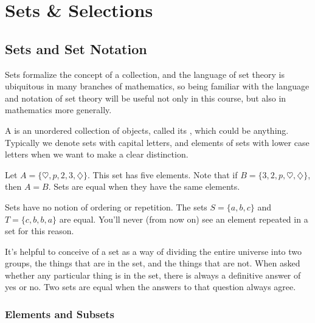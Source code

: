 \pagestyle{headings}
\chapter{Sets \& Selections} \label{chp 2}

\section{Sets and Set Notation}

Sets formalize the concept of a collection, and the language of set theory is ubiquitous in many branches of mathematics, so being familiar with the language and notation of set theory will be useful not only in this course, but also in mathematics more generally.

\begin{definition}
A  is an unordered collection of objects, called its , which could be anything. Typically we denote sets with capital letters, and elements of sets with lower case letters when we want to make a clear distinction.
\end{definition}

\begin{example}
Let $A = \{\heartsuit, p, 2, 3, \diamondsuit\}$. This set has five elements. Note that if $B = \{3,2,p,\heartsuit,\diamondsuit\}$, then $A = B$. Sets are equal when they have the same elements.
\end{example}

\begin{keypoint}
Sets have no notion of ordering or repetition. The sets $S =\{a,b,c\}$ and $T=\{c,b,b,a\}$ are equal. You'll never (from now on) see an element repeated in a set for this reason. \end{keypoint}

It's helpful to conceive of a set as a way of dividing the entire universe into two groups, the things that are in the set, and the things that are not. When asked whether any particular thing is in the set, there is always a definitive answer of yes or no. Two sets are equal when the answers to that question always agree.

\subsection*{Elements and Subsets}

